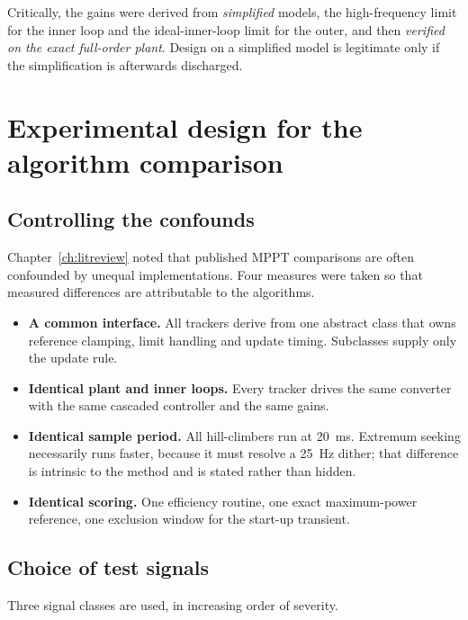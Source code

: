 Critically, the gains were derived from \emph{simplified} models, the
high-frequency limit for the inner loop and the ideal-inner-loop limit for the
outer, and then \emph{verified on the exact full-order plant}. Design on a
simplified model is legitimate only if the simplification is afterwards
discharged.

\section{Experimental design for the algorithm comparison}

\subsection{Controlling the confounds}

Chapter~\ref{ch:litreview} noted that published MPPT comparisons are often
confounded by unequal implementations. Four measures were taken so that measured
differences are attributable to the algorithms.

\begin{itemize}[leftmargin=1.4em]
  \item \textbf{A common interface.} All trackers derive from one abstract class
        that owns reference clamping, limit handling and update timing.
        Subclasses supply only the update rule.
  \item \textbf{Identical plant and inner loops.} Every tracker drives the same
        converter with the same cascaded controller and the same gains.
  \item \textbf{Identical sample period.} All hill-climbers run at
        \SI{20}{\milli\second}. Extremum seeking necessarily runs faster,
        because it must resolve a \SI{25}{\hertz} dither; that difference is
        intrinsic to the method and is stated rather than hidden.
  \item \textbf{Identical scoring.} One efficiency routine, one exact
        maximum-power reference, one exclusion window for the start-up
        transient.
\end{itemize}

\subsection{Choice of test signals}

Three signal classes are used, in increasing order of severity.

